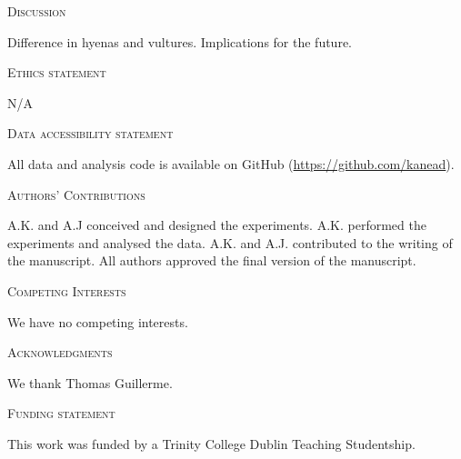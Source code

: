 \documentclass[12pt,letterpaper]{article}
\renewcommand{\section}[1]{%
\bigskip
\begin{center}
\begin{Large}
\normalfont\scshape #1
\medskip
\end{Large}
\end{center}}
\begin{document}
%
%

\section{Discussion}
Difference in hyenas and vultures. Implications for the future. 

\section{Ethics statement}
N/A
\section{Data accessibility statement}
All data and analysis code is available on GitHub (\url{https://github.com/kanead}).
\section{Authors' Contributions}
A.K. and A.J conceived and designed the experiments. A.K. performed the experiments and analysed the data. A.K. and A.J. contributed to the writing of the manuscript. All authors approved the final version of the manuscript.
\section{Competing Interests}
We have no competing interests.
\section{Acknowledgments}
We thank Thomas Guillerme.
\section{Funding statement}
This work was funded by a Trinity College Dublin Teaching Studentship.




\end{document}
